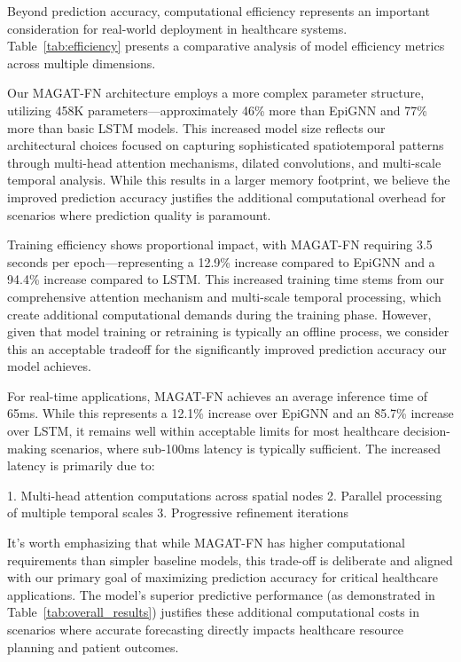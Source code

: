 \documentclass[lettersize, journal]{IEEEtran}
\begin{document}
Beyond prediction accuracy, computational efficiency represents an important consideration for real-world deployment in healthcare systems. Table~\ref{tab:efficiency} presents a comparative analysis of model efficiency metrics across multiple dimensions.

Our MAGAT-FN architecture employs a more complex parameter structure, utilizing 458K parameters—approximately 46\% more than EpiGNN and 77\% more than basic LSTM models. This increased model size reflects our architectural choices focused on capturing sophisticated spatiotemporal patterns through multi-head attention mechanisms, dilated convolutions, and multi-scale temporal analysis. While this results in a larger memory footprint, we believe the improved prediction accuracy justifies the additional computational overhead for scenarios where prediction quality is paramount.

Training efficiency shows proportional impact, with MAGAT-FN requiring 3.5 seconds per epoch—representing a 12.9\% increase compared to EpiGNN and a 94.4\% increase compared to LSTM. This increased training time stems from our comprehensive attention mechanism and multi-scale temporal processing, which create additional computational demands during the training phase. However, given that model training or retraining is typically an offline process, we consider this an acceptable tradeoff for the significantly improved prediction accuracy our model achieves.

For real-time applications, MAGAT-FN achieves an average inference time of 65ms. While this represents a 12.1\% increase over EpiGNN and an 85.7\% increase over LSTM, it remains well within acceptable limits for most healthcare decision-making scenarios, where sub-100ms latency is typically sufficient. The increased latency is primarily due to:

1. Multi-head attention computations across spatial nodes
2. Parallel processing of multiple temporal scales
3. Progressive refinement iterations

It's worth emphasizing that while MAGAT-FN has higher computational requirements than simpler baseline models, this trade-off is deliberate and aligned with our primary goal of maximizing prediction accuracy for critical healthcare applications. The model's superior predictive performance (as demonstrated in Table~\ref{tab:overall_results}) justifies these additional computational costs in scenarios where accurate forecasting directly impacts healthcare resource planning and patient outcomes.
\end{document}
